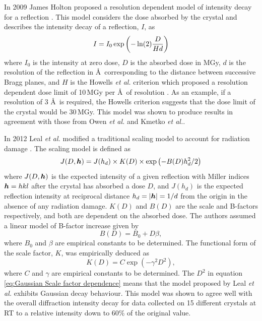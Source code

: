         In 2009 James Holton proposed a resolution dependent model of intensity decay for a reflection \cite{holton2009}. This model considers the dose absorbed by the crystal and describes the intensity decay of a reflection, $I$, as
        \begin{equation}
            I = I_0 \exp \left(-\ln(2)\frac{D}{Hd}\right)
        \end{equation}
        where $I_0$ is the intensity at zero dose, $D$ is the absorbed dose in MGy, $d$ is the resolution of the reflection in \AA\ corresponding to the distance between successive Bragg planes, and $H$ is the Howells \textit{et al.} criterion which proposed a resolution dependent dose limit of 10\,MGy per \AA\ of resolution \cite{howells2009}.
        As an example, if a resolution of 3 \AA\ is required, the Howells criterion suggests that the dose limit of the crystal would be 30\,MGy.
		This model was shown to produce results in agreement with those from Owen \textit{et al.} and Kmetko \textit{et al.}.

        In 2012 Leal \textit{et al.} modified a traditional scaling model to account for radiation damage \cite{leal2012}. The scaling model is defined as
        \begin{equation}
            J(D,\boldsymbol{h}) = J(h_d) \times K(D) \times \exp\left( -B(D) h_d^2/2\right)
			\label{eq:Scaling Model Leal 2012}
        \end{equation}
        where $J(D,\boldsymbol{h})$ is the expected intensity of a given reflection with Miller indices $\boldsymbol{h} = hkl$ after the crystal has absorbed a dose $D$, and $J(h_d)$ is the expected reflection intensity at reciprocal distance $h_d = |\boldsymbol{h}| = 1/d$ from the origin in the absence of any radiation damage.
		$K(D)$ and $B(D)$ are the scale and B-factors respectively, and both are dependent on the absorbed dose.
		The authors assumed a linear model of B-factor increase given by
		\begin{equation}
			B(D) = B_0 + D \beta,
            \label{eq:Linear B factor dependence}
		\end{equation}
		where $B_0$ and $\beta$ are empirical constants to be determined.
		The functional form of the scale factor, $K$, was empirically deduced as
		\begin{equation}
			K(D) = C \exp\left(-\gamma^2 D^2\right),
            \label{eq:Gaussian Scale factor dependence}
		\end{equation}
		where $C$ and $\gamma$ are empirical constants to be determined.
        The $D^2$ in equation \ref{eq:Gaussian Scale factor dependence} means that the model proposed by Leal \textit{et al.} exhibits Gaussian decay behaviour.
		This model was shown to agree well with the overall diffraction intensity decay for data collected on 15 different crystals at RT to a relative intensity down to 60\% of the original value.

